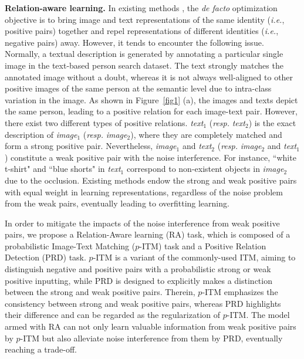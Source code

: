 \documentclass{article}
\begin{document}
\textbf{Relation-aware learning.}
In existing methods \cite{han2021textreid,li2022learning}, the \emph{de facto} optimization objective is to bring image and text representations of the same identity (\emph{i.e.}, positive pairs) together and repel representations of different identities (\emph{i.e.}, negative pairs) away.
However, it tends to encounter the following issue.
Normally, a textual description is generated by annotating a particular single image in the text-based person search dataset. The text strongly matches the annotated image without a doubt, whereas it is not always well-aligned to other positive images of the same person at the semantic level due to intra-class variation in the image.
As shown in Figure~\ref{fig1} (a), the images and texts depict the same person, leading to a positive relation for each image-text pair.
However, there exist two different types of positive relations.
\textit{text$_1$} (\emph{resp.} \textit{text$_2$}) is the exact description of \textit{image$_1$} (\emph{resp.} \textit{image$_2$}), where they are completely matched and form a strong positive pair.
Nevertheless, \textit{image$_1$} and \textit{text$_2$} (\emph{resp.} \textit{image$_2$} and \textit{text$_1$}) constitute a weak positive pair with the noise interference.
For instance, ``white t-shirt" and ``blue shorts" in \textit{text$_1$} correspond to non-existent objects in \textit{image$_2$} due to the occlusion.
Existing methods endow the strong and weak positive pairs with equal weight in learning representations, regardless of the noise problem from the weak pairs, eventually leading to overfitting learning.



In order to mitigate the impacts of the noise interference from weak positive pairs, we propose a Relation-Aware learning (RA) task, which is composed of a probabilistic Image-Text Matching ($p$-ITM) task and a Positive Relation Detection (PRD) task.
$p$-ITM is a variant of the commonly-used ITM, aiming to distinguish negative and positive pairs with a probabilistic strong or weak positive inputting, while PRD is designed to explicitly makes a distinction between the strong and weak positive pairs.
Therein, $p$-ITM emphasizes the consistency between strong and weak positive pairs, whereas PRD highlights their difference and can be regarded as the regularization of $p$-ITM. 
The model armed with RA can not only learn valuable information from weak positive pairs by $p$-ITM but also alleviate noise interference from them by PRD, eventually reaching a trade-off.
\end{document}
